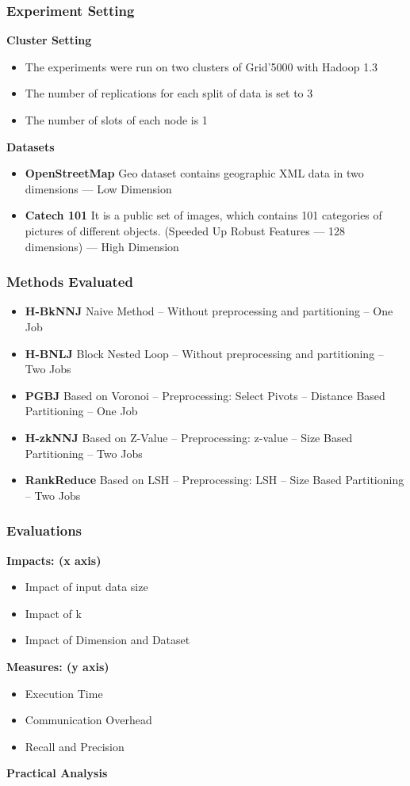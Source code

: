 \begin{frame}
\frametitle{Experiment Setting}
\textbf{Cluster Setting}
\vspace{-0.1in}
\begin{itemize}
\item The experiments were run on two clusters of Grid'5000 with Hadoop 1.3

\item The number of replications for each split of data is set to 3

\item The number of slots of each node is 1
\end{itemize}
\textbf{Datasets}
\vspace{-0.1in}
\begin{itemize}
\item \textbf{OpenStreetMap} Geo dataset contains geographic XML data in two dimensions  --- Low Dimension
\item \textbf{Catech 101} It is a public set of images, which contains 101 categories of pictures of different objects. (Speeded Up Robust Features --- 128 dimensions) --- High Dimension
\end{itemize}
\end{frame}

\begin{frame}
\frametitle{Methods Evaluated}
\begin{itemize}
\item \textbf{H-BkNNJ} Naive Method -- Without preprocessing and partitioning -- One Job
\item \textbf{H-BNLJ} Block Nested Loop -- Without preprocessing and partitioning -- Two Jobs
\item \textbf{PGBJ} Based on Voronoi -- Preprocessing: Select Pivots -- Distance Based Partitioning -- One Job
\item \textbf{H-zkNNJ} Based on Z-Value -- Preprocessing: z-value -- Size Based Partitioning -- Two Jobs
\item \textbf{RankReduce} Based on LSH -- Preprocessing: LSH -- Size Based Partitioning -- Two Jobs
\end{itemize}
\end{frame}

\begin{frame}
\frametitle{Evaluations}
\textbf{Impacts:  (x axis)}
\begin{itemize}
\item Impact of input data size
\item Impact of k
\item Impact of Dimension and Dataset
\end{itemize}
\textbf{Measures: (y axis)}
\begin{itemize}
\item Execution Time
\item Communication Overhead
\item Recall and Precision
\end{itemize}
\textbf{Practical Analysis}
\end{frame}

